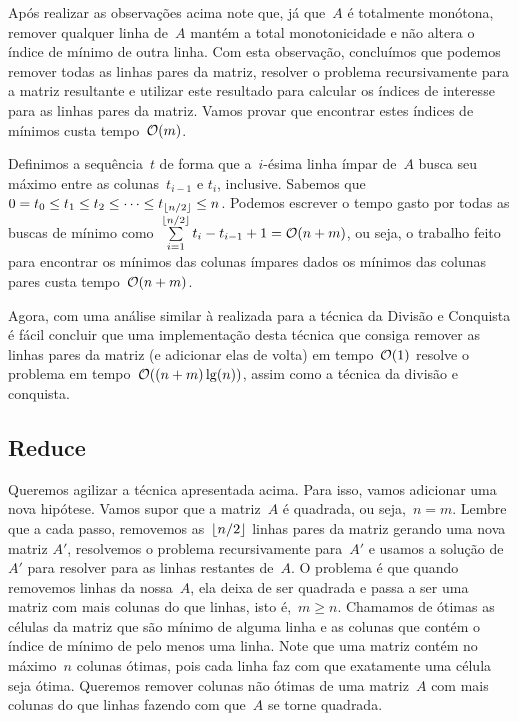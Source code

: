 Após realizar as observações acima note que, já que~$A$ é totalmente monótona, remover qualquer linha de~$A$ mantém a total monotonicidade e não altera o índice de mínimo de outra linha. Com esta observação, concluímos que podemos remover todas as linhas pares da matriz, resolver o problema recursivamente para a matriz resultante e utilizar este resultado para calcular os índices de interesse para as linhas pares da matriz. Vamos provar que encontrar estes índices de mínimos custa tempo~$\mathcal{O}(m)$. 

Definimos a sequência~$t$ de forma que a~$i$-ésima linha ímpar de~$A$ busca seu máximo entre as colunas~$t_{i-1}$ e $t_{i}$, inclusive. Sabemos que~$0 = t_0 \leq t_1 \leq t_2 \leq \dots \leq t_{\lfloor n/2\rfloor} \leq n$. Podemos escrever o tempo gasto por todas as buscas de mínimo como~$\sum \limits_{i=1}^{\lfloor n/2\rfloor} t_i - t_{i-1} + 1 = \mathcal{O}(n+m)$, ou seja, o trabalho feito para encontrar os mínimos das colunas ímpares dados os mínimos das colunas pares custa tempo~$\mathcal{O}(n+m)$.

Agora, com uma análise similar à realizada para a técnica da Divisão e Conquista é fácil concluir que uma implementação desta técnica que consiga remover as linhas pares da matriz (e adicionar elas de volta) em tempo~$\mathcal{O}(1)$ resolve o problema em tempo~$\mathcal{O}((n+m)\lg(n))$, assim como a técnica da divisão e conquista.


\subsection{Reduce} \label{SMAWK:reduce}
Queremos agilizar a técnica apresentada acima. Para isso, vamos adicionar uma nova hipótese. Vamos supor que a matriz~$A$ é quadrada, ou seja,~$n = m$. Lembre que a cada passo, removemos as~$\lfloor n/2\rfloor$ linhas pares da matriz gerando uma nova matriz $A'$, resolvemos o problema recursivamente para~$A'$ e usamos a solução de~$A'$ para resolver para as linhas restantes de~$A$. O problema é que quando removemos linhas da nossa~$A$, ela deixa de ser quadrada e passa a ser uma matriz com mais colunas do que linhas, isto é,~$m \geq n$. Chamamos de ótimas as células da matriz que são mínimo de alguma linha e as colunas que contém o índice de mínimo de pelo menos uma linha. Note que uma matriz contém no máximo~$n$ colunas ótimas, pois cada linha faz com que exatamente uma célula seja ótima. Queremos remover colunas não ótimas de uma matriz~$A$ com mais colunas do que linhas fazendo com que~$A$ se torne quadrada.  

